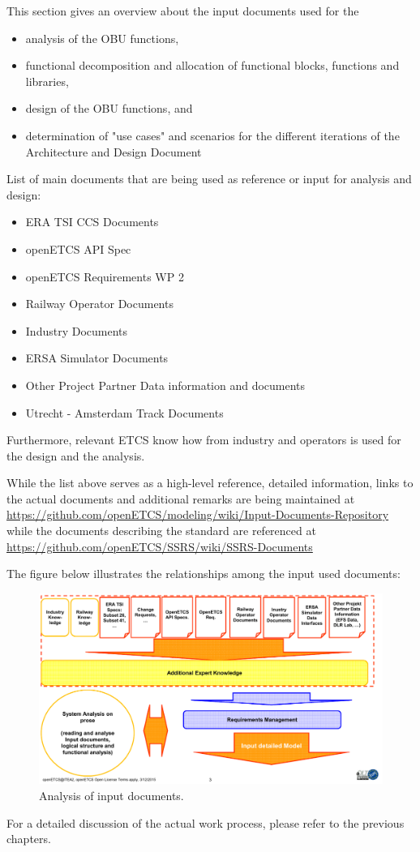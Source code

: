 This section gives an overview about the input documents used for the
\begin{itemize}
\item analysis of the OBU functions,
\item functional decomposition and allocation of functional blocks, functions and libraries,
\item design of the OBU functions, and
\item determination of "use cases" and scenarios for the different iterations of the Architecture and Design Document
\end{itemize} 

List of main documents that are being used as reference or input for analysis and design:
\begin{itemize}
\item ERA TSI CCS Documents
\item openETCS API Spec
\item openETCS Requirements WP 2
\item Railway Operator Documents
\item Industry Documents
\item ERSA Simulator Documents
\item Other Project Partner Data information and documents
\item Utrecht - Amsterdam Track Documents
\end{itemize}

Furthermore, relevant ETCS know how from industry and operators is used for the design and the analysis.

While the list above serves as a high-level reference, detailed information, links to the actual documents and additional remarks are being maintained at
\url{https://github.com/openETCS/modeling/wiki/Input-Documents-Repository}
while the documents describing the standard are referenced at \url{https://github.com/openETCS/SSRS/wiki/SSRS-Documents}

The figure below illustrates  the relationships among the input used documents:

\begin{figure}
\includegraphics[scale=0.5]{images/AnalysisDocuments}
\caption{Analysis of input documents.}
\label{Analyising of input document}
\end{figure}

For a detailed discussion of the actual work process, please refer to the previous chapters. 

